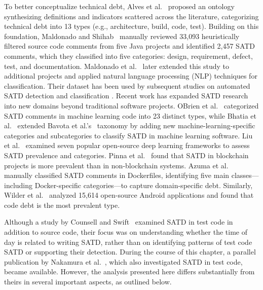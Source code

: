 To better conceptualize technical debt, Alves et al.~\cite{alves_towards_2014} proposed an ontology synthesizing definitions and indicators scattered across the literature, categorizing technical debt into 13 types (e.g., architecture, build, code, test). Building on this foundation, Maldonado and Shihab~\cite{maldonado_detecting_2015} manually reviewed 33,093 heuristically filtered source code comments from five Java projects and identified 2,457 SATD comments, which they classified into five categories: design, requirement, defect, test, and documentation. Maldonado et al.~\cite{maldonado_using_2017} later extended this study to additional projects and applied natural language processing (NLP) techniques for classification. Their dataset has been used by subsequent studies on automated SATD detection and classification \cite{ sheikhaei_empirical_2024, guo_how_2021, gu_self-admitted_2024, arcelli_fontana_binary_2025, fucci_waiting_2021, njeru_hybrid_2025}.
Recent work has expanded SATD research into new domains beyond traditional software projects. OBrien et al.~\cite{obrien_artifact_2022} categorized SATD comments in machine learning code into 23 distinct types, while Bhatia et al.~\cite{bhatia_empirical_2025} extended Bavota et al.’s~\cite{bavota_large-scale_2016} taxonomy by adding new machine-learning-specific categories and subcategories to classify SATD in machine learning software. Liu et al.~\cite{liu_is_2020} examined seven popular open-source deep learning frameworks to assess SATD prevalence and categories. Pinna et al.~\cite{pinna_investigation_2023} found that SATD in blockchain projects is more prevalent than in non-blockchain systems. Azuma et al.~\cite{azuma_empirical_2022} manually classified SATD comments in Dockerfiles, identifying five main classes—including Docker-specific categories—to capture domain-specific debt. Similarly, Wilder et al.~\cite{wilder_exploratory_2023} analyzed 15,614 open-source Android applications and found that code debt is the most prevalent type.

Although a study by Counsell and Swift~\cite{counsell_timing_2022} examined SATD in test code in addition to source code, their focus was on understanding whether the time of day is related to writing SATD, rather than on identifying patterns of test code SATD or supporting their detection. During the course of this chapter, a parallel publication by Nakamura et al.~\cite{nakamura2025understanding}, which also investigated SATD in test code, became available. However, the analysis presented here differs substantially from theirs in several important aspects, as outlined below.

